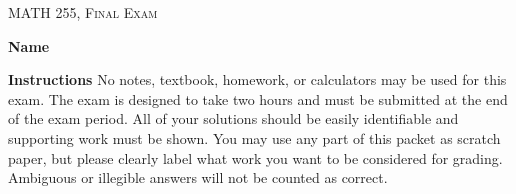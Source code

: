 \documentclass[12pt]{amsbook}
\begin{document}




\begin{center}
   \textsc{\large MATH 255, Final Exam}\\
\end{center}
\vspace{1cm}

\textbf{Name} \; \underline{\hspace{5cm}}

\vspace{1cm}

\textbf{Instructions} \; No notes, textbook, homework, or calculators may be used for this exam. The exam is designed to take two hours and must be submitted at the end of the exam period. All of your solutions should be easily identifiable and supporting work must be shown. You may use any part of this packet as scratch paper, but please clearly label what work you want to be considered for grading. Ambiguous or illegible answers will not be counted as correct.

%
%
%
%
%
%
%
%
%
%
%
%
%
%
%
%
%
\end{document}
